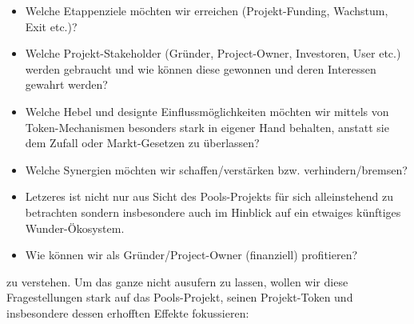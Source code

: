 \begin{itemize}
	\item Welche Etappenziele möchten wir erreichen (Projekt-Funding, Wachstum, Exit etc.)?
	\item Welche Projekt-Stakeholder (Gründer, Project-Owner, Investoren, User etc.) werden gebraucht und wie können diese gewonnen und deren Interessen gewahrt werden?
	\item Welche Hebel und designte Einflussmöglichkeiten möchten wir mittels von Token-Mechanismen besonders stark in eigener Hand behalten, anstatt sie dem Zufall oder Markt-Gesetzen zu überlassen?
	\item Welche Synergien möchten wir schaffen/verstärken bzw. verhindern/bremsen?
	\item Letzeres ist nicht nur aus Sicht des Pools-Projekts für sich alleinstehend zu betrachten sondern insbesondere auch im Hinblick auf ein etwaiges künftiges Wunder-Ökosystem. 
	\item Wie können wir als Gründer/Project-Owner (finanziell) profitieren?
\end{itemize}

zu verstehen. Um das ganze nicht ausufern zu lassen, wollen wir diese Fragestellungen stark auf das Pools-Projekt, seinen Projekt-Token und insbesondere dessen erhofften Effekte fokussieren:

\vspace{0.3cm}

